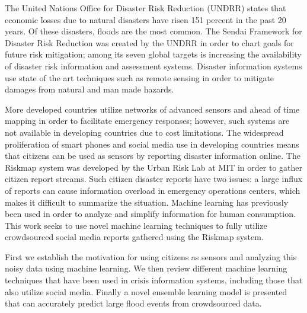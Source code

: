
% 
% 
%


The United Nations Office for Disaster Risk Reduction (UNDRR) states that economic losses
due to natural disasters have risen 151 percent in the past 20 years. Of these
disasters, floods are the most common. The Sendai Framework for Disaster Risk Reduction
was created by the UNDRR in order to chart goals for future risk mitigation; among its
seven global targets is increasing the availability of disaster risk information
and assessment systems. Disaster information systems use state of the art techniques such as
remote sensing in order to mitigate damages from natural and man made hazards.

More developed countries utilize networks of advanced sensors and
ahead of time mapping in order to facilitate emergency responses;
however, such systems are not available in developing countries due to cost limitations.
The widespread proliferation of smart phones and social media use in
developing countries means that citizens can be used as sensors by reporting
disaster information online. The Riskmap system was developed by the
Urban Risk Lab at MIT in order to gather citizen report streams. Such citizen
disaster reports have two issues:  a large influx of reports can cause
information overload in emergency operations centers, which makes it difficult to
summarize the situation. Machine learning has previously been used in order to
analyze and simplify information for human consumption. This work seeks to use
novel machine learning techniques to fully utilize crowdsourced social media reports gathered
using the Riskmap system.

    First we establish the motivation for using citizens as sensors and
analyzing this noisy data using machine learning. We then review different
machine learning techniques that have been used in crisis information systems,
including those that also utilize social media.
Finally a novel ensemble learning model is presented that can accurately predict
large flood events from crowdsourced
data.
